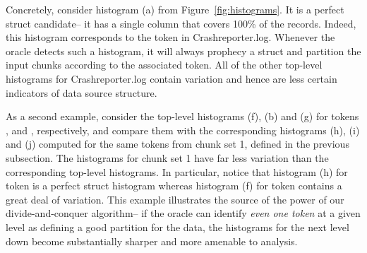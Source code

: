 \begin {figure*}
\begin{center}
\begin{minipage}[t]{0.59\columnwidth}
\end{minipage}
\hfill
\begin{minipage}[t]{0.53\columnwidth}
\end{minipage}
\hfill
\begin{minipage}[t]{0.295\columnwidth}
\end{minipage}
\hfill
\begin{minipage}[t]{0.59\columnwidth}
\end{minipage}
%
%
%
\caption{Histograms (a), (b), (c), (d), (e), (f) and
(g) are generated from top-level analysis of Crashreporter.log tokens.
The corresponding tokens are (a) {\tt [*]}, 
(b)  {\tt Pint}, (c) {\tt PDate}, (d) {\tt PTime}, (e) {\tt -}, (f) {\tt Palpha} and
(g) {\tt Pwhite}.  Histograms (h) {\tt Palpha}, (i) {\tt Pint}, and 
(j) {\tt Pwhite} are generated from analysis of Crashreporter.log from
set 1 (the second level of recursion).  Histogram (k) is generated from
top-level analysis of the {\tt |} token from the Sirius data.} \shrink
\label{fig:histograms} 
\end{center}
\end{figure*}

Concretely, consider histogram (a)
from Figure~\ref{fig:histograms}.  It is a perfect struct candidate--
it has a single column that covers 100\% of the records.  Indeed,
this histogram corresponds to the \cd{[*]} token in Crashreporter.log.
Whenever the oracle detects such a histogram, it will always prophecy
a struct and partition the input chunks according to the associated
token. All of the other top-level histograms for Crashreporter.log
contain variation and hence are less certain indicators of data source
structure. 

As a second example, consider the top-level histograms (f), (b) and
(g) for tokens ,  and , respectively, 
and compare them with the corresponding histograms (h),
(i) and (j) computed for the same tokens from chunk set 1, defined in the
previous subsection.  The histograms for chunk set 1 have far less variation
than the corresponding top-level histograms.  In particular, notice
that histogram (h) for token  is a perfect struct histogram
whereas histogram (f) for token 
contains a great deal of variation.  This example illustrates the
source of the power of our divide-and-conquer algorithm-- if the
oracle can identify {\em even one token} at a given level as
defining a good partition for the data, the histograms for the next
level down become substantially sharper and more amenable to analysis.

